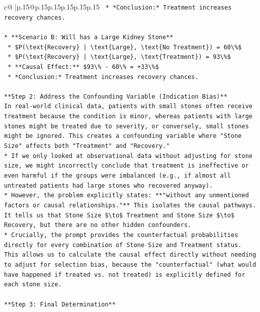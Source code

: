 \documentclass{article}
\begin{document}
{\begin{supertabular}{c@{$\;$}|p{.15\linewidth}@{}p{.15\linewidth}p{.15\linewidth}p{.15\linewidth}p{.15\linewidth}p{.15\linewidth}}
{{{\texttt{    *   *Conclusion:* Treatment increases recovery chances.} \\
\\ 
\texttt{*   **Scenario B: Will has a Large Kidney Stone**} \\
\texttt{    *   \$P(\textbackslash{}text\{Recovery\} | \textbackslash{}text\{Large\}, \textbackslash{}text\{No Treatment\}) = 60\textbackslash{}\%\$} \\
\texttt{    *   \$P(\textbackslash{}text\{Recovery\} | \textbackslash{}text\{Large\}, \textbackslash{}text\{Treatment\}) = 93\textbackslash{}\%\$} \\
\texttt{    *   **Causal Effect:** \$93\textbackslash{}\% {-} 60\textbackslash{}\% = +33\textbackslash{}\%\$} \\
\texttt{    *   *Conclusion:* Treatment increases recovery chances.} \\
\\ 
\texttt{**Step 2: Address the Confounding Variable (Indication Bias)**} \\
\texttt{In real{-}world clinical data, patients with small stones often receive treatment because the condition is minor, whereas patients with large stones might be treated due to severity, or conversely, small stones might be ignored. This creates a confounding variable where "Stone Size" affects both "Treatment" and "Recovery."} \\
\texttt{*   If we only looked at observational data without adjusting for stone size, we might incorrectly conclude that treatment is ineffective or even harmful if the groups were imbalanced (e.g., if almost all untreated patients had large stones who recovered anyway).} \\
\texttt{*   However, the problem explicitly states: **"without any unmentioned factors or causal relationships."** This isolates the causal pathways. It tells us that Stone Size \$\textbackslash{}to\$ Treatment and Stone Size \$\textbackslash{}to\$ Recovery, but there are no other hidden confounders.} \\
\texttt{*   Crucially, the prompt provides the counterfactual probabilities directly for every combination of Stone Size and Treatment status. This allows us to calculate the causal effect directly without needing to adjust for selection bias, because the "counterfactual" (what would have happened if treated vs. not treated) is explicitly defined for each stone size.} \\
\\ 
\texttt{**Step 3: Final Determination**} \\
}}}
\end{supertabular}}
\end{document}
